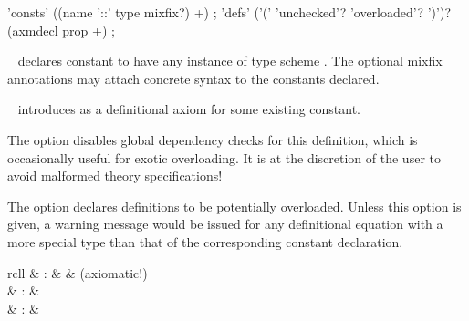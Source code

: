 \begin{isabellebody}
\begin{isamarkuptext}
  \begin{rail}
    'consts' ((name '::' type mixfix?) +)
    ;
    'defs' ('(' 'unchecked'? 'overloaded'? ')')? \\ (axmdecl prop +)
    ;
  \end{rail}

  \begin{description}

  \item \hyperlink{command.consts}{\mbox{}}~ declares constant  to have any instance of type scheme \isa{{\isasymsigma}}.  The optional
  mixfix annotations may attach concrete syntax to the constants
  declared.
  
  \item \hyperlink{command.defs}{\mbox{}}~ introduces 
  as a definitional axiom for some existing constant.
  
  The  option disables global dependency checks
  for this definition, which is occasionally useful for exotic
  overloading.  It is at the discretion of the user to avoid malformed
  theory specifications!
  
  The  option declares definitions to be
  potentially overloaded.  Unless this option is given, a warning
  message would be issued for any definitional equation with a more
  special type than that of the corresponding constant declaration.
  
  \end{description}%
\end{isamarkuptext}%
\isamarkuptrue%
%
\isamarkuptrue%
%
\begin{isamarkuptext}%
\begin{matharray}{rcll}
    \hypertarget{command.axioms}{\hyperlink{command.axioms}{\mbox{}}} & : &  & (axiomatic!) \\
    \hypertarget{command.lemmas}{\hyperlink{command.lemmas}{\mbox{}}} & : &  \\
    \hypertarget{command.theorems}{\hyperlink{command.theorems}{\mbox{}}} & : &  \\
  \end{matharray}


\end{isamarkuptext}
\end{isabellebody}
